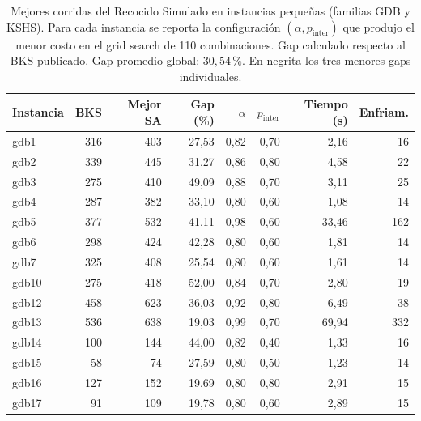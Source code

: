 
\begin{table}[htbp]
  \centering
  \footnotesize
  \caption{%
    Mejores corridas del Recocido Simulado en instancias pequeñas (familias GDB y KSHS).
    Para cada instancia se reporta la configuración \((\alpha, p_{\text{inter}})\) que produjo
    el menor costo en el grid search de 110 combinaciones. Gap calculado respecto al BKS publicado.
    Gap promedio global: \(30{,}54\,\%\). En negrita los tres menores gaps individuales.%
  }
  \label{tab:sa_small_resumen}
  \begin{tabular}{l r r r r r r r}
    \toprule
    Instancia &
    BKS &
    Mejor SA &
    Gap (\%) &
    $\alpha$ &
    $p_{\text{inter}}$ &
    Tiempo (s) &
    Enfriam. \\
    \midrule
    gdb1   &  316 &  403 &        27{,}53 & 0{,}82 & 0{,}70 &  2{,}16 &  16 \\
    gdb2   &  339 &  445 &        31{,}27 & 0{,}86 & 0{,}80 &  4{,}58 &  22 \\
    gdb3   &  275 &  410 &        49{,}09 & 0{,}88 & 0{,}70 &  3{,}11 &  25 \\
    gdb4   &  287 &  382 &        33{,}10 & 0{,}80 & 0{,}60 &  1{,}08 &  14 \\
    gdb5   &  377 &  532 &        41{,}11 & 0{,}98 & 0{,}60 & 33{,}46 & 162 \\
    gdb6   &  298 &  424 &        42{,}28 & 0{,}80 & 0{,}60 &  1{,}81 &  14 \\
    gdb7   &  325 &  408 &        25{,}54 & 0{,}80 & 0{,}60 &  1{,}61 &  14 \\
    gdb10  &  275 &  418 &        52{,}00 & 0{,}84 & 0{,}70 &  2{,}80 &  19 \\
    gdb12  &  458 &  623 &        36{,}03 & 0{,}92 & 0{,}80 &  6{,}49 &  38 \\
    gdb13  &  536 &  638 &        19{,}03 & 0{,}99 & 0{,}70 & 69{,}94 & 332 \\
    gdb14  &  100 &  144 &        44{,}00 & 0{,}82 & 0{,}40 &  1{,}33 &  16 \\
    gdb15  &   58 &   74 &        27{,}59 & 0{,}80 & 0{,}50 &  1{,}23 &  14 \\
    gdb16  &  127 &  152 &        19{,}69 & 0{,}80 & 0{,}80 &  2{,}91 &  15 \\
    gdb17  &   91 &  109 &        19{,}78 & 0{,}80 & 0{,}60 &  2{,}89 &  15 \\

\end{tabular}
\end{table}
